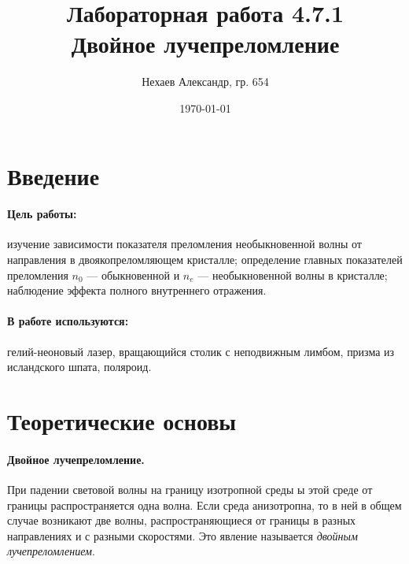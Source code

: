 \documentclass[a4paper, 12pt]{article}
\title{Лабораторная работа 4.7.1\\Двойное лучепреломление}
\author{Нехаев Александр, гр. 654}
\date{\today}
\begin{document}
	\maketitle
	\newpage
	\tableofcontents
	\newpage
	\section{Введение}
	\paragraph{Цель работы:}
	изучение зависимости показателя преломления необыкновенной волны от направления в двоякопреломляющем кристалле; определение главных показателей преломления $n_0$ — обыкновенной и $n_e$ — необыкновенной волны в кристалле; наблюдение эффекта полного внутреннего отражения.\par
		\paragraph{В работе используются:}
	гелий-неоновый лазер, вращающийся столик с неподвижным лимбом, призма из исландского шпата, поляроид.
	\section{Теоретические основы}
	\paragraph{Двойное лучепреломление.}
	При падении световой волны на границу изотропной среды ы этой среде от границы распространяется одна волна. Если среда анизотропна, то в ней в общем случае возникают две волны, распространяющиеся от границы в разных направлениях и с разными скоростями. Это явление называется \textit{двойным лучепреломлением}.
\end{document}
